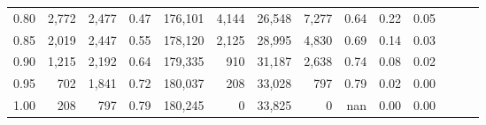 \begin{tabular}{rrrrrrrrrrrrrr}
0.80 &   2,772 &  2,477 &  0.47 &  176,101 &    4,144 &  26,548 &   7,277 &  0.64 &  0.22 &      0.05 \\
0.85 &   2,019 &  2,447 &  0.55 &  178,120 &    2,125 &  28,995 &   4,830 &  0.69 &  0.14 &      0.03 \\
0.90 &   1,215 &  2,192 &  0.64 &  179,335 &      910 &  31,187 &   2,638 &  0.74 &  0.08 &      0.02 \\
0.95 &     702 &  1,841 &  0.72 &  180,037 &      208 &  33,028 &     797 &  0.79 &  0.02 &      0.00 \\
1.00 &     208 &    797 &  0.79 &  180,245 &        0 &  33,825 &       0 &   nan &  0.00 &      0.00 \\
\bottomrule
\end{tabular}
